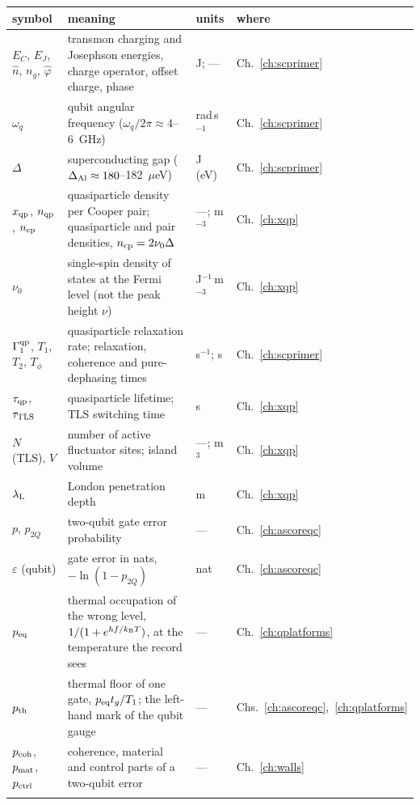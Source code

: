 {\small\begin{longtable}{@{}>{\raggedright\arraybackslash}p{}>{\raggedright\arraybackslash}p{}>{\raggedright\arraybackslash}p{}>{\raggedright\arraybackslash}p{}@{}}
\toprule symbol & meaning & units & where\\\midrule\endhead
$E_C$, $E_J$, $\hat n$, $n_g$, $\hat\varphi$ & transmon charging and Josephson energies, charge operator, offset charge, phase & J; --- & Ch.~\ref{ch:scprimer}\\\iamrowrule
$\omega_q$ & qubit angular frequency ($\omega_q/2\pi\approx4$--6~GHz) & rad\,s$^{-1}$ & Ch.~\ref{ch:scprimer}\\\iamrowrule
$\Delta$ & superconducting gap ($\Delta_{\rm Al}\approx180$--182~$\mu$eV) & J (eV) & Ch.~\ref{ch:scprimer}\\\iamrowrule
$x_{\mathrm{qp}}$, $n_{\rm qp}$, $n_{\mathrm{cp}}$ & quasiparticle density per Cooper pair; quasiparticle and pair densities, $n_{\mathrm{cp}}=2\nu_0\Delta$ & ---; m$^{-3}$ & Ch.~\ref{ch:xqp}\\\iamrowrule
$\nu_0$ & single-spin density of states at the Fermi level (not the peak height $\nu$) & J$^{-1}$\,m$^{-3}$ & Ch.~\ref{ch:xqp}\\\iamrowrule
$\Gamma_1^{\rm qp}$, $T_1$, $T_2$, $T_\phi$ & quasiparticle relaxation rate; relaxation, coherence and pure-dephasing times & s$^{-1}$; s & Ch.~\ref{ch:scprimer}\\\iamrowrule
$\tau_{\mathrm{qp}}$, $\tau_{\mathrm{TLS}}$ & quasiparticle lifetime; TLS switching time & s & Ch.~\ref{ch:xqp}\\\iamrowrule
$N$ (TLS), $V$ & number of active fluctuator sites; island volume & ---; m$^3$ & Ch.~\ref{ch:xqp}\\\iamrowrule
$\lambda_{\mathrm L}$ & London penetration depth & m & Ch.~\ref{ch:xqp}\\\iamrowrule
$p$, $p_{2Q}$ & two-qubit gate error probability & --- & Ch.~\ref{ch:ascoreqc}\\\iamrowrule
$\varepsilon$ (qubit) & gate error in nats, $-\ln(1-p_{2Q})$ & nat & Ch.~\ref{ch:ascoreqc}\\\iamrowrule
$p_{\rm eq}$ & thermal occupation of the wrong level, $1/(1+e^{hf/k_{\mathrm B} T})$, at the temperature the record sees & --- & Ch.~\ref{ch:qplatforms}\\\iamrowrule
$p_{\rm th}$ & thermal floor of one gate, $p_{\rm eq}t_g/T_1$; the left-hand mark of the qubit gauge & --- & Chs.~\ref{ch:ascoreqc},~\ref{ch:qplatforms}\\\iamrowrule
$p_{\rm coh}$, $p_{\rm mat}$, $p_{\rm ctrl}$ & coherence, material and control parts of a two-qubit error & --- & Ch.~\ref{ch:walls}\\\iamrowrule

\end{longtable}}
